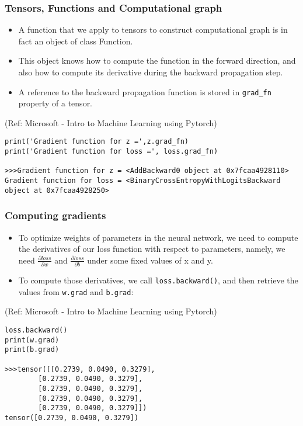 \begin{frame}[fragile] \frametitle{Tensors, Functions and Computational graph}


\begin{itemize}
\item A function that we apply to tensors to construct computational graph is in fact an object of class Function. 
\item This object knows how to compute the function in the forward direction, and also how to compute its derivative during the backward propagation step. 
\item A reference to the backward propagation function is stored in \lstinline|grad_fn| property of a tensor.
\end{itemize}

\tiny{(Ref: Microsoft - Intro to Machine Learning using Pytorch)}


\begin{lstlisting}
print('Gradient function for z =',z.grad_fn)
print('Gradient function for loss =', loss.grad_fn)

>>>Gradient function for z = <AddBackward0 object at 0x7fcaa4928110>
Gradient function for loss = <BinaryCrossEntropyWithLogitsBackward object at 0x7fcaa4928250>
\end{lstlisting}

\end{frame}

\begin{frame}[fragile] \frametitle{Computing gradients}

\begin{itemize}
\item To optimize weights of parameters in the neural network, we need to compute the derivatives of our loss function with respect to parameters, namely, we need  $\frac{\partial loss}{\partial w}$ and
$\frac{\partial loss}{\partial b}$   under some fixed values of x and y. 
\item To compute those derivatives, we call \lstinline|loss.backward()|, and then retrieve the values from \lstinline|w.grad| and \lstinline|b.grad|:
\end{itemize}

\tiny{(Ref: Microsoft - Intro to Machine Learning using Pytorch)}


\begin{lstlisting}
loss.backward()
print(w.grad)
print(b.grad)

>>>tensor([[0.2739, 0.0490, 0.3279],
        [0.2739, 0.0490, 0.3279],
        [0.2739, 0.0490, 0.3279],
        [0.2739, 0.0490, 0.3279],
        [0.2739, 0.0490, 0.3279]])
tensor([0.2739, 0.0490, 0.3279])
\end{lstlisting}

\end{frame}

